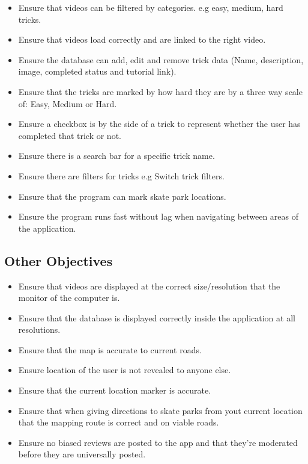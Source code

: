 \begin{itemize}
\item Ensure that videos can be filtered by categories. e.g easy, medium, hard tricks.
\item Ensure that videos load correctly and are linked to the right video.
\item Ensure the database can add, edit and remove trick data (Name, description, image, completed status and tutorial link).
\item Ensure that the tricks are marked by how hard they are by a three way scale of: Easy, Medium or Hard.
\item Ensure a checkbox is by the side of a trick to represent whether the user has completed that trick or not.
\item Ensure there is a search bar for a specific trick name.
\item Ensure there are filters for tricks e.g Switch trick filters.
\item Ensure that the program can mark skate park locations.
\item Ensure the program runs fast without lag when navigating between areas of the application.
\end{itemize}

\subsection{Other Objectives}

\begin{itemize}
\item Ensure that videos are displayed at the correct size/resolution that the monitor of the computer is.
\item Ensure that the database is displayed correctly inside the application at all resolutions.
\item Ensure that the map is accurate to current roads.
\item Ensure location of the user is not revealed to anyone else.
\item Ensure that the current location marker is accurate.
\item Ensure that when giving directions to skate parks from yout current location that the mapping route is correct and on viable roads. 
\item Ensure no biased reviews are posted to the app and that they're moderated before they are universally posted.
\end{itemize}

